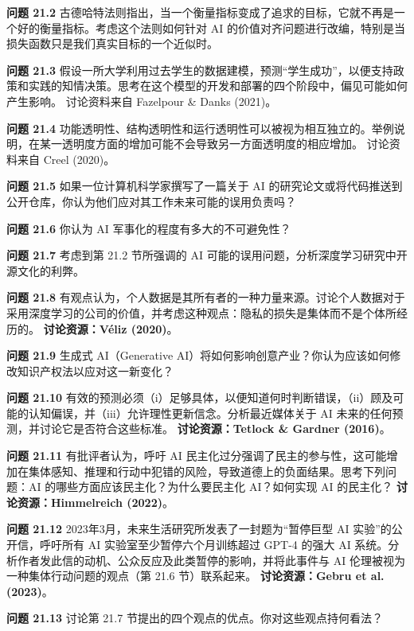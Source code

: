 \documentclass[lang=cn,newtx,10pt,scheme=chinese]{elegantbook}
\begin{document}
\textbf{问题 21.2} 古德哈特法则指出，当一个衡量指标变成了追求的目标，它就不再是一个好的衡量指标。考虑这个法则如何针对 AI 的价值对齐问题进行改编，特别是当损失函数只是我们真实目标的一个近似时。

\textbf{问题 21.3} 假设一所大学利用过去学生的数据建模，预测“学生成功”，以便支持政策和实践的知情决策。思考在这个模型的开发和部署的四个阶段中，偏见可能如何产生影响。 讨论资料来自 Fazelpour \& Danks (2021)。

\textbf{问题 21.4} 功能透明性、结构透明性和运行透明性可以被视为相互独立的。举例说明，在某一透明度方面的增加可能不会导致另一方面透明度的相应增加。 讨论资料来自 Creel (2020)。

\textbf{问题 21.5} 如果一位计算机科学家撰写了一篇关于 AI 的研究论文或将代码推送到公开仓库，你认为他们应对其工作未来可能的误用负责吗？

\textbf{问题 21.6} 你认为 AI 军事化的程度有多大的不可避免性？

\textbf{问题 21.7} 考虑到第 21.2 节所强调的 AI 可能的误用问题，分析深度学习研究中开源文化的利弊。

\textbf{问题 21.8} 有观点认为，个人数据是其所有者的一种力量来源。讨论个人数据对于采用深度学习的公司的价值，并考虑这种观点：隐私的损失是集体而不是个体所经历的。
\textbf{讨论资源：Véliz (2020)}。

\textbf{问题 21.9} 生成式 AI（Generative AI）将如何影响创意产业？你认为应该如何修改知识产权法以应对这一新变化？

\textbf{问题 21.10} 有效的预测必须（i）足够具体，以便知道何时判断错误，（ii）顾及可能的认知偏误，并（iii）允许理性更新信念。分析最近媒体关于 AI 未来的任何预测，并讨论它是否符合这些标准。
\textbf{讨论资源：Tetlock \& Gardner (2016)}。

\textbf{问题 21.11} 有批评者认为，呼吁 AI 民主化过分强调了民主的参与性，这可能增加在集体感知、推理和行动中犯错的风险，导致道德上的负面结果。思考下列问题：AI 的哪些方面应该民主化？为什么要民主化 AI？如何实现 AI 的民主化？
\textbf{讨论资源：Himmelreich (2022)}。

\textbf{问题 21.12} 2023年3月，未来生活研究所发表了一封题为“暂停巨型 AI 实验”的公开信，呼吁所有 AI 实验室至少暂停六个月训练超过 GPT-4 的强大 AI 系统。分析作者发此信的动机、公众反应及此类暂停的影响，并将此事件与 AI 伦理被视为一种集体行动问题的观点（第 21.6 节）联系起来。
\textbf{讨论资源：Gebru et al. (2023)}。

\textbf{问题 21.13} 讨论第 21.7 节提出的四个观点的优点。你对这些观点持何看法？
\end{document}
